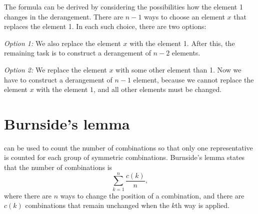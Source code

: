 The formula can be derived by considering
the possibilities how the element 1 changes
in the derangement.
There are $n-1$ ways to choose an element $x$
that replaces the element 1.
In each such choice, there are two options:

\textit{Option 1:} We also replace the element $x$
with the element 1.
After this, the remaining task is to construct
a derangement of $n-2$ elements.

\textit{Option 2:} We replace the element $x$
with some other element than 1.
Now we have to construct a derangement
of $n-1$ element, because we cannot replace
the element $x$ with the element $1$, and all other
elements must be changed.

\section{Burnside's lemma}


can be used to count
the number of combinations so that
only one representative is counted
for each group of symmetric combinations.
Burnside's lemma states that the number of
combinations is
\[\sum_{k=1}^n \frac{c(k)}{n},\]
where there are $n$ ways to change the
position of a combination,
and there are $c(k)$ combinations that
remain unchanged when the $k$th way is applied.

